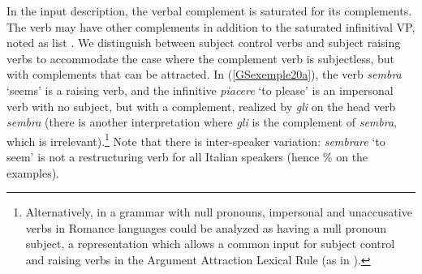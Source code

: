 {\begin{exe}
\begin{xlist}
	\end{xlist}
\end{exe}

In the input description, the verbal complement is saturated for its complements. The verb may have other complements in addition to the saturated infinitival VP, noted as list . We distinguish between subject control verbs and subject raising verbs to accommodate the case where the complement verb is subjectless, but with complements that can be attracted. In (\ref{GSexemple20a}), the verb \emph{sembra} `seems' is a raising verb, and the infinitive \emph{piacere} `to please' is an impersonal verb with no subject, but with a complement, realized by \emph{gli} on the head verb \emph{sembra} (there is another interpretation where \emph{gli} is the complement of \emph{sembra}, which is irrelevant).\footnote{Alternatively, in a grammar with null pronouns, impersonal and unaccusative verbs in Romance languages could be analyzed as having a null pronoun subject, a representation which allows a common input for subject control and raising verbs in the Argument Attraction Lexical Rule (as in \citealt[331]{Monachesi98a}).} Note that there is inter-speaker variation: \emph{sembrare} `to seem' is not a restructuring verb for all Italian speakers (hence \% on the examples).

}
